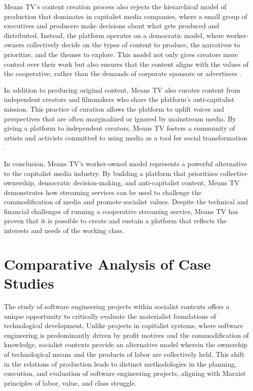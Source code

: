 \begin{refsection}
Means TV’s content creation process also rejects the hierarchical model of production that dominates in capitalist media companies, where a small group of executives and producers make decisions about what gets produced and distributed. Instead, the platform operates on a democratic model, where worker-owners collectively decide on the types of content to produce, the narratives to prioritize, and the themes to explore. This model not only gives creators more control over their work but also ensures that the content aligns with the values of the cooperative, rather than the demands of corporate sponsors or advertisers \cite[pp.~77-90]{scholz2017}.

In addition to producing original content, Means TV also curates content from independent creators and filmmakers who share the platform’s anti-capitalist mission. This practice of curation allows the platform to uplift voices and perspectives that are often marginalized or ignored by mainstream media. By giving a platform to independent creators, Means TV fosters a community of artists and activists committed to using media as a tool for social transformation \cite[pp.~104-118]{robbins2020}.

In conclusion, Means TV’s worker-owned model represents a powerful alternative to the capitalist media industry. By building a platform that prioritizes collective ownership, democratic decision-making, and anti-capitalist content, Means TV demonstrates how streaming services can be used to challenge the commodification of media and promote socialist values. Despite the technical and financial challenges of running a cooperative streaming service, Means TV has proven that it is possible to create and sustain a platform that reflects the interests and needs of the working class.

\section{Comparative Analysis of Case Studies}

The study of software engineering projects within socialist contexts offers a unique opportunity to critically evaluate the materialist foundations of technological development. Unlike projects in capitalist systems, where software engineering is predominantly driven by profit motives and the commodification of knowledge, socialist contexts provide an alternative model wherein the ownership of technological means and the products of labor are collectively held. This shift in the relations of production leads to distinct methodologies in the planning, execution, and evaluation of software engineering projects, aligning with Marxist principles of labor, value, and class struggle.


\end{refsection}
